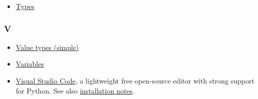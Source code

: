 \documentclass[
]{book}
\providecommand{\tightlist}{%
  \setlength{\itemsep}{0pt}\setlength{\parskip}{0pt}}
\begin{document}
\begin{itemize}
\tightlist
\item
  \protect\hyperlink{value-types}{Types}
\end{itemize}

\hypertarget{v}{%
\subsubsection*{V}\label{v}}

\begin{itemize}
\item
  \protect\hyperlink{value-types}{Value types (simple)}
\item
  \protect\hyperlink{variables}{Variables}
\item
  \href{https://code.visualstudio.com/}{Visual Studio Code}, a lightweight free open-source editor with strong support for Python. See also \protect\hyperlink{install-vs-code}{installation notes}.
\end{itemize}
\end{document}

